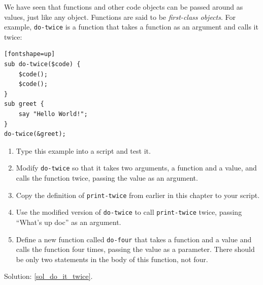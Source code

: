 \begin{exercise}
\label{do_it_twice}


We have seen that functions and other code objects can be 
passed around as values, just like any object. Functions are said 
to be \emph{first-class objects}. For example, \verb"do-twice" is a function
that takes a function as an argument and calls it twice:

\begin{verbatim}[fontshape=up]
sub do-twice($code) {
    $code(); 
    $code();
}
sub greet {
    say "Hello World!";
}
do-twice(&greet);
\end{verbatim}

\begin{enumerate}

\item Type this example into a script and test it.

\item Modify \verb"do-twice" so that it takes two arguments, a
function and a value, and calls the function twice,
passing the value as an argument.

\item Copy the definition of 
\verb"print-twice" from earlier in this chapter to your script.

\item Use the modified version of \verb"do-twice" to call
\verb"print-twice" twice, passing ``What's up doc'' as an argument.

\item Define a new function called 
\verb"do-four" that takes a function and a value
and calls the function four times, passing the value
as a parameter.  There should be only
two statements in the body of this function, not four.

\end{enumerate}

Solution: \ref{sol_do_it_twice}.

\end{exercise}



